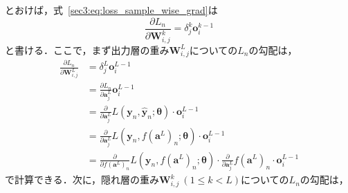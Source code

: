 \documentclass[12pt]{jarticle}
\numberwithin{equation}{section}    %
\numberwithin{figure}{section}      %
\numberwithin{table}{section}      %
\begin{document}
とおけば，式~\eqref{sec3:eq:loss_sample_wise_grad}は
\begin{equation}
    \frac{\partial L_{n}}{\partial \bm{W}_{i, j}^{k}} = \delta_{j}^{k} \bm{o}_{i}^{k - 1}
\end{equation}
と書ける．ここで，まず出力層の重み$\bm{W}_{i, j}^{L}$についての$L_{n}$の勾配は，
\begin{align}
    \frac{\partial L_{n}}{\partial \bm{W}_{i, j}^{L}} & = \delta_{j}^{L} \bm{o}_{i}^{L - 1}                                                                                                                                                   \\
                                                      & = \frac{\partial L_{n}}{\partial \bm{a}_{j}^{L}} \bm{o}_{i}^{L - 1}                                                                                                                   \\
                                                      & = \frac{\partial}{\partial \bm{a}_{j}^{L}} L(\bm{y}_{n}, \hat{\bm{y}}_{n}; \bm{\theta}) \cdot \bm{o}_{i}^{L - 1}                                                                      \\
                                                      & = \frac{\partial}{\partial \bm{a}_{j}^{L}} L(\bm{y}_{n}, f(\bm{a}^{L})_{n}; \bm{\theta}) \cdot \bm{o}_{i}^{L - 1}                                                                     \\
                                                      & = \frac{\partial}{\partial f(\bm{a}^{L})_{n}} L(\bm{y}_{n}, f(\bm{a}^{L})_{n}; \bm{\theta}) \cdot \frac{\partial}{\partial \bm{a}_{j}^{L}} f(\bm{a}^{L})_{n} \cdot \bm{o}_{i}^{L - 1}
\end{align}
で計算できる．次に，隠れ層の重み$\bm{W}_{i, j}^{k} ~ (1 \le k < L)$についての$L_{n}$の勾配は，
\end{document}

